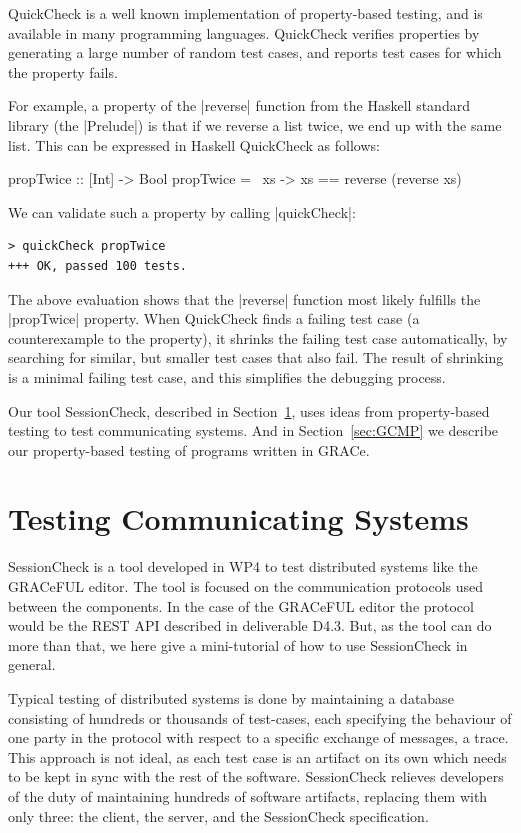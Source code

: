 \documentclass{article}
\begin{document}
QuickCheck is a well known implementation of property-based testing,
and is available in many programming languages.
%
QuickCheck verifies properties by generating a large number of random
test cases, and reports test cases for which the property fails.

For example, a property of the |reverse| function from the Haskell
standard library (the |Prelude|) is that if we reverse a list twice,
we end up with the same list.
%
This can be expressed in Haskell QuickCheck as follows:
%
\begin{haskellcode}
propTwice :: [Int] -> Bool
propTwice = \ xs -> xs == reverse (reverse xs)
\end{haskellcode}
%
We can validate such a property by calling |quickCheck|:
\begin{verbatim}
> quickCheck propTwice
+++ OK, passed 100 tests.
\end{verbatim}
The above evaluation shows that the |reverse| function most likely
fulfills the |propTwice| property.
%
When QuickCheck finds a failing test case (a counterexample to the
property), it shrinks the failing test case automatically, by
searching for similar, but smaller test cases that also fail.
%
The result of shrinking is a minimal failing test case, and this
simplifies the debugging process.

Our tool SessionCheck, described in Section~\ref{sec:SessionCheck},
uses ideas from property-based testing to test communicating systems.
%
And in Section~\ref{sec:GCMP} we describe our property-based testing
of programs written in GRACe.

\section{Testing Communicating Systems}
\label{sec:SessionCheck}
%
SessionCheck \cite{SessionCheck} is a tool developed in WP4 to test distributed systems like
the GRACeFUL editor.
%
The tool is focused on the communication protocols used between the components.
%
In the case of the GRACeFUL editor the protocol would be the REST API described in deliverable D4.3. %
%
But, as the tool can do more than that, we here give a mini-tutorial
of how to use SessionCheck in general.

Typical testing of distributed systems is done by maintaining a database consisting of hundreds
or thousands of test-cases, each specifying the behaviour of one party in the protocol with
respect to a specific exchange of messages, a trace.
%
This approach is not ideal, as each test case is an artifact on its own which needs to be kept
in sync with the rest of the software.
%
SessionCheck relieves developers of the duty of maintaining hundreds of software
artifacts, replacing them with only three: the client, the server, and the SessionCheck specification.
\end{document}
